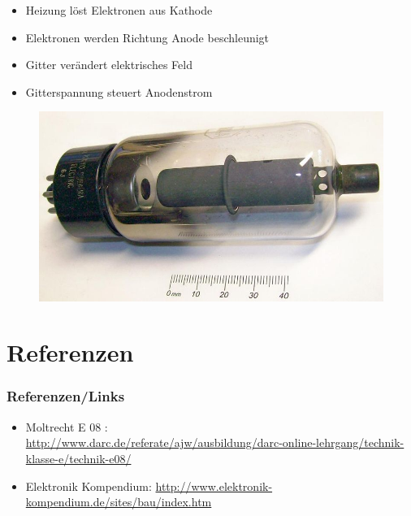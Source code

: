 \begin{frame}
\begin{minipage}{0.3\textwidth}
\begin{figure}
    \end{figure}
\end{minipage}
\hspace{0.5cm}
\begin{minipage}{0.5\textwidth}
\begin{small}
	\begin{itemize}
		\item Heizung löst Elektronen aus Kathode
		\item Elektronen werden Richtung Anode beschleunigt
		\item Gitter verändert elektrisches Feld
		\item Gitterspannung steuert Anodenstrom
	\end{itemize}
	\end{small}
\begin{center}
 \begin{figure}
        \includegraphics[width=\textwidth,height=.3\textheight,keepaspectratio]{e13/Triode.jpg}
      \end{figure}
\end{center}
\end{minipage}
\end{frame}

\section*{Referenzen}
\begin{frame}
    \frametitle{Referenzen/Links}
    
    \footnotesize
    \begin{itemize}
        \item Moltrecht E 08 : \\
              \url{http://www.darc.de/referate/ajw/ausbildung/darc-online-lehrgang/technik-klasse-e/technik-e08/}
		\item Elektronik Kompendium:
			\url{http://www.elektronik-kompendium.de/sites/bau/index.htm}
    \end{itemize}

\end{frame}


